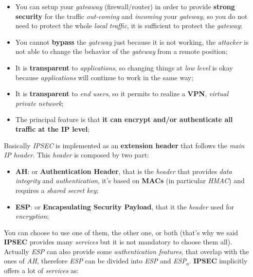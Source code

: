 \documentclass{article}
\begin{document}
\begin{itemize}
\item You can setup your \emph{gateaway} (firewall/router) in order to provide \textbf{strong security} for the traffic \emph{out-coming} and \emph{incoming} your \emph{gateway}, so you do not need to protect the whole \emph{local traffic}, it is sufficient to protect the \emph{gateway};
\item You cannot \textbf{bypass} the \emph{gateway} just because it is not working, the \emph{attacker} is not able to change the behavior of the \emph{gateway} from a remote position;
\item It is \textbf{transparent} to \emph{applications}, so changing things at \emph{low level} is okay because \emph{applications} will continue to work in the same way;
\item It is \textbf{transparent} to \emph{end users}, so it permits to realize a \textbf{VPN}, \emph{virtual private network};
\item The principal feature is that \textbf{it can encrypt and/or authenticate all traffic at the IP level};
\end{itemize}
Basically \emph{IPSEC} is implemented as an \textbf{extension header} that follows the \emph{main IP header}. This \emph{header} is composed by two part:
\begin{itemize}
\item \textbf{AH}: or \textbf{Authentication Header}, that is the \emph{header} that provides \emph{data integrity} and \emph{authentication}, it's based on \textbf{MACs} (in particular \emph{HMAC}) and requires a \emph{shared secret key};
\item \textbf{ESP}: or \textbf{Encapsulating Security Payload}, that it the \emph{header} used for \emph{encryption};
\end{itemize}
You can choose to use one of them, the other one, or both (that’s why we said \textbf{IPSEC} provides many \emph{services} but it is not mandatory to choose them all). Actually \emph{ESP} can also provide some \emph{authentication features}, that overlap with the ones of \emph{AH}, therefore \emph{ESP} can be divided into \emph{ESP} and \emph{ESP}$_a$. \clearpage
\textbf{IPSEC} implicitly offers a lot of \emph{services} as:
\end{document}
